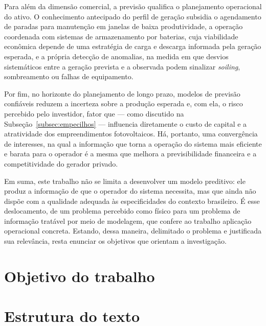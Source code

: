 Para além da dimensão comercial, a previsão qualifica o planejamento operacional
do ativo. O conhecimento antecipado do perfil de geração subsidia o agendamento
de paradas para manutenção em janelas de baixa produtividade, a operação
coordenada com sistemas de armazenamento por baterias, cuja viabilidade
econômica depende de uma estratégia de carga e descarga informada pela geração
esperada, e a própria detecção de anomalias, na medida em que desvios
sistemáticos entre a geração prevista e a observada podem sinalizar
\textit{soiling}, sombreamento ou falhas de equipamento. 

Por fim, no horizonte do planejamento de longo prazo, modelos de previsão confiáveis reduzem a incerteza
sobre a produção esperada e, com ela, o risco percebido pelo investidor, fator
que --- como discutido na Subseção~\ref{subsec:empecilhos} --- influencia
diretamente o custo de capital e a atratividade dos empreendimentos
fotovoltaicos. Há, portanto, uma convergência de interesses, na qual a informação que
torna a operação do sistema mais eficiente e barata para o operador é a mesma que
melhora a previsibilidade financeira e a competitividade do gerador privado.

Em suma, este trabalho não se limita a desenvolver um modelo preditivo: ele
produz a informação de que o operador do sistema necessita, mas que ainda não
dispõe com a qualidade adequada às especificidades do contexto brasileiro. 
É esse deslocamento, de um problema percebido como físico para um problema de informação tratável por meio de modelagem, que confere
ao trabalho aplicação operacional concreta. Estando, dessa maneira, delimitado o problema e justificada
sua relevância, resta enunciar os objetivos que orientam a investigação.

\section{Objetivo do trabalho}
\label{subsec:objetivo}

\section{Estrutura do texto}
\label{subsec:estrutura}
